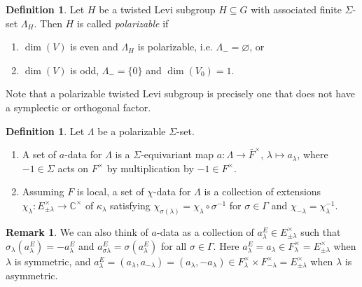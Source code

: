 \documentclass{article}
\def\C{\mathbb{C}}
\theoremstyle{definition}
\newtheorem{rem}[thm]{Remark}
\newtheorem{dfn}[thm]{Definition}
\numberwithin{equation}{subsection}
\renewcommand{\-}{\hyp{}}
\begin{document}
\begin{dfn}
	Let $H$ be a twisted Levi subgroup $H \subseteq G$ with associated finite $\Sigma$-set $\Lambda_H$. Then $H$ is called \emph{polarizable} if
	\begin{enumerate}
		\item $\dim(V)$ is even and $\Lambda_H$ is polarizable, i.e. $\Lambda_-=\varnothing$, or
		\item $\dim(V)$ is odd, $\Lambda_-=\{0\}$ and $\dim(V_0)=1$.
	\end{enumerate}
\end{dfn}

Note that a polarizable twisted Levi subgroup is precisely one that does not have a symplectic or orthogonal factor.


\begin{dfn} \label{dfn:achi}
	Let $\Lambda$ be a polarizable $\Sigma$-set.
	\begin{enumerate}
		\item A set of $a$-data for $\Lambda$ is a $\Sigma$-equivariant map $a : \Lambda \to \bar F^\times$, $\lambda \mapsto a_\lambda$, where $-1 \in \Sigma$ acts on $F^\times$ by multiplication by $-1 \in F^\times$. 
\item Assuming $F$ is local, a set of $\chi$-data for $\Lambda$ is a collection of extensions $\chi_\lambda : E_{\pm\lambda}^\times \to \C^\times$ of $\kappa_\lambda$ satisfying $\chi_{\sigma(\lambda)}=\chi_\lambda\circ\sigma^{-1}$ for $\sigma \in \Gamma$ and $\chi_{-\lambda}=\chi_\lambda^{-1}$.
\end{enumerate}
\end{dfn}

\begin{rem} \label{rem:adata}
	We can also think of $a$-data as a collection of $a_\lambda^E \in E_{\pm\lambda}^\times$ such that $\sigma_\lambda(a_\lambda^E)=-a_\lambda^E$ and $a_{\sigma\lambda}^E=\sigma(a_\lambda^E)$ for all $\sigma \in \Gamma$. Here $a_\lambda^E=a_\lambda \in F_\lambda^\times=E_{\pm\lambda}^\times$ when $\lambda$ is symmetric, and $a_\lambda^E=(a_\lambda,a_{-\lambda})=(a_\lambda,-a_\lambda) \in F_\lambda^\times \times F_{-\lambda}^\times = E_{\pm\lambda}^\times$ when $\lambda$ is asymmetric.
\end{rem}
\end{document}
